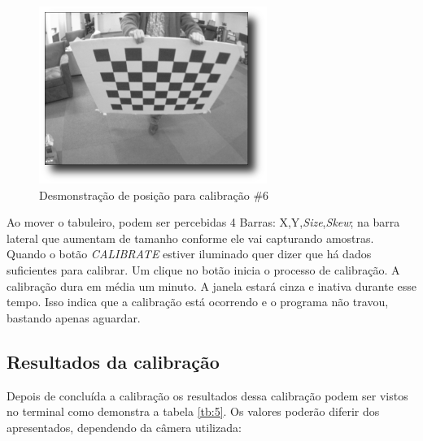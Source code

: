 \begin{figure}[H]
  \includegraphics[width=\linewidth]{Imagens/figura3-19.png}
  \caption{Desmonstração de posição para calibração \#6 \cite{Documentacao-CalibrateMonocularCamera}}\label{fig3:19}
\endminipage
\end{figure}

Ao mover o tabuleiro, podem ser percebidas 4 Barras: X,Y,\textit{Size},\textit{Skew}; na barra lateral que aumentam de tamanho conforme ele vai capturando amostras. Quando o botão \textit{CALIBRATE} estiver iluminado quer dizer que há dados suficientes para calibrar. Um clique no botão inicia o processo de calibração.
A calibração dura em média um minuto. A janela estará cinza e inativa durante esse tempo. Isso indica que a calibração está ocorrendo e o programa não travou, bastando apenas aguardar.

\subsection{Resultados da calibração}

Depois de concluída a calibração os resultados dessa calibração podem ser vistos no terminal como demonstra a tabela \ref{tb:5}. Os valores poderão diferir dos apresentados, dependendo da câmera utilizada:


